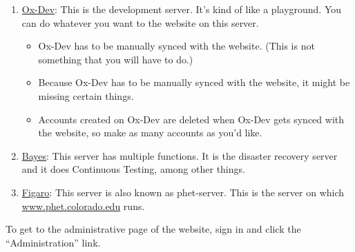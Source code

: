 \documentclass[titlepage]{article}
\begin{document}
		\begin{enumerate}
			\item \href{ox-dev.colorado.edu}{Ox-Dev}: This is the development server. It's kind of like a playground. You can do whatever you want to the website on this server.
			
				\begin{itemize}
					\item Ox-Dev has to be manually synced with the website. (This is not something that you will have to do.)
					\item Because Ox-Dev has to be manually synced with the website, it might be missing certain things.
					\item Accounts created on Ox-Dev are deleted when Ox-Dev gets synced with the website, so make as many accounts as you'd like.
				\end{itemize}
			
			\item \href{bayes.colorado.edu}{Bayes}: This server has multiple functions. It is the disaster recovery server and it does Continuous Testing, among other things.

			\item \href{phet.colorado.edu}{Figaro}: This server is also known as phet-server. This is the server on which \href{phet.colorado.edu}{www.phet.colorado.edu} runs.
			
		\end{enumerate}

To get to the administrative page of the website, sign in and click the ``Administration'' link.
\end{document}

